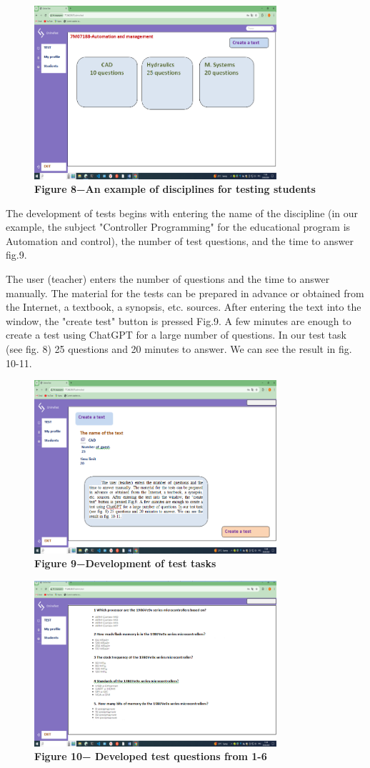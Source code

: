 \begin{figure}[H]
	\centering
	\includegraphics[height=0.4\textwidth, width=0.8\textwidth]{assets/133}
	\caption*{\bfseries Figure 8−An example of disciplines for testing students}
\end{figure}

\begin{multicols}{2}
The development of tests begins with entering the name of the discipline
(in our example, the subject "Controller Programming" for the
educational program is Automation and control), the number of test
questions, and the time to answer fig.9.

The user (teacher) enters the number of questions and the time to answer
manually. The material for the tests can be prepared in advance or
obtained from the Internet, a textbook, a synopsis, etc. sources. After
entering the text into the window, the "create test" button is pressed
Fig.9. A few minutes are enough to create a test using ChatGPT for a
large number of questions. In our test task (see fig. 8) 25 questions
and 20 minutes to answer. We can see the result in fig. 10-11.
\end{multicols}

\begin{figure}[H]
	\centering
	\includegraphics[height=0.35\textwidth, width=0.8\textwidth]{assets/134}
	\caption*{\bfseries Figure 9−Development of test tasks}
\end{figure}



\begin{figure}[H]
	\centering
	\includegraphics[height=0.35\textwidth, width=0.8\textwidth]{assets/135}
	\caption*{\bfseries Figure 10− Developed test questions from 1-6}
\end{figure}


